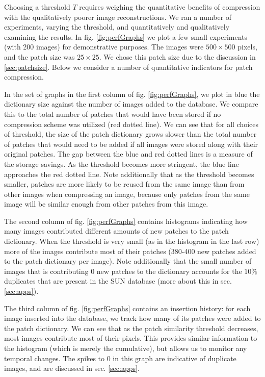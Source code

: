 Choosing a threshold $T$ requires weighing the quantitative benefits of compression with the qualitatively poorer image reconstructions. We ran a number of experiments, varying the threshold, and quantitatively and qualitatively examining the results. In fig. \ref{fig:perfGraphs} we plot a few small experiments (with 200 images) for demonstrative purposes. The images were $500\times 500$ pixels, and the patch size was $25\times 25$. We chose this patch size due to the discussion in \ref{sec:patchsize}. Below we consider a number of quantitative indicators for patch compression. 

In the set of graphs in the first column of fig. \ref{fig:perfGraphs}, we plot in blue the dictionary size against the number of images added to the database. We compare this to the total number of patches that would have been stored if no compression scheme was utilized (red dotted line). We can see that for all choices of threshold, the size of the patch dictionary grows slower than the total number of patches that would need to be added if all images were stored along with their original patches. The gap between the blue and red dotted lines is a measure of the storage savings. As the threshold becomes more stringent, the blue line approaches the red dotted line. Note additionally that as the threshold becomes smaller, patches are more likely to be reused from the same image than from other images when compressing an image, because only patches from the same image will be similar enough from other patches from this image.

The second column of fig. \ref{fig:perfGraphs} contains histograms indicating how many images contributed different amounts of new patches to the patch dictionary. When the threshold is very small (as in the histogram in the last row) more of the images contribute most of their patches (380-400 new patches added to the patch dictionary per image). Note additionally that the small number of images that is contributing 0 new patches to the dictionary accounts for the $10\%$ duplicates that are present in the SUN database (more about this in sec. \ref{sec:apps}).

The third column of fig. \ref{fig:perfGraphs} contains an insertion history: for each image inserted into the database, we track how many of its patches were added to the patch dictionary. We can see that as the patch similarity threshold decreases, most images contribute most of their pixels. This provides similar information to the histogram (which is merely the cumulative), but allows us to monitor any temporal changes. The spikes to 0 in this graph are indicative of duplicate images, and are discussed in sec. \ref{sec:apps}.

